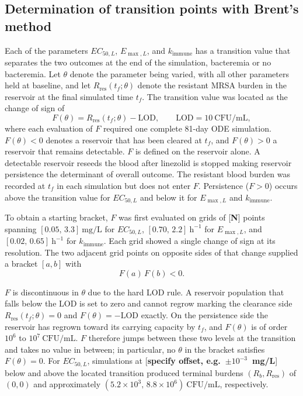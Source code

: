 \documentclass[utf8]{FrontiersinHarvard} %
\begin{document}
\subsection{Determination of transition points with Brent's method}
\label{sec:transition}

Each of the parameters $EC_{50,L}$, $E_{\max,L}$, and $k_{\mathrm{immune}}$ has
a transition value that separates the two outcomes at the end of the
simulation, bacteremia or no bacteremia. Let $\theta$ denote
the parameter being varied, with all other parameters held at baseline, and let
$R_{\mathrm{res}}(t_f;\theta)$ denote the resistant MRSA burden in the
reservoir at the final simulated time $t_f$. The transition value was located
as the change of sign of
\begin{equation}
    F(\theta) = R_{\mathrm{res}}(t_f;\theta) - \mathrm{LOD},
    \qquad \mathrm{LOD} = 10~\mathrm{CFU/mL},
    \label{eq:brent-objective}
\end{equation}
where each evaluation of $F$ required one complete 81-day ODE simulation.
$F(\theta) < 0$ denotes a reservoir that has been cleared at $t_f$, and
$F(\theta) > 0$ a reservoir that remains detectable. $F$ is defined on the
reservoir alone.  A detectable reservoir reseeds the blood after
linezolid is stopped making reservoir persistence the determinant of overall outcome.
The resistant blood burden was recorded at $t_f$ in each simulation but does
not enter $F$. Persistence ($F > 0$) occurs above the transition value for
$EC_{50,L}$ and below it for $E_{\max,L}$ and $k_{\mathrm{immune}}$.

To obtain a starting bracket, $F$ was first evaluated on grids of
[\textbf{N}] points spanning $[0.05,\, 3.3]~\mathrm{mg/L}$ for $EC_{50,L}$,
$[0.70,\, 2.2]~\mathrm{h}^{-1}$ for $E_{\max,L}$, and
$[0.02,\, 0.65]~\mathrm{h}^{-1}$ for $k_{\mathrm{immune}}$. Each grid showed a
single change of sign at its resolution. The two adjacent grid points on
opposite sides of that change supplied a bracket $[a,b]$ with
\begin{equation}
    F(a)\,F(b) < 0.
    \label{eq:brent-bracket}
\end{equation}

$F$ is discontinuous in $\theta$ due to the hard LOD rule. A reservoir
population that falls below the LOD is set to zero and cannot regrow marking
the clearance side $R_{\mathrm{res}}(t_f;\theta) = 0$ and
$F(\theta) = -\mathrm{LOD}$ exactly. On the persistence side the reservoir has
regrown toward its carrying capacity by $t_f$, and $F(\theta)$ is of order
$10^{6}$ to $10^{7}~\mathrm{CFU/mL}$. $F$ therefore jumps between these two
levels at the transition and takes no value in between; in particular, no
$\theta$ in the bracket satisfies $F(\theta) = 0$. For $EC_{50,L}$, simulations
at [\textbf{specify offset, e.g.\ $\pm 10^{-3}$~mg/L}] below and above the
located transition produced terminal burdens $(R_b, R_{\mathrm{res}})$ of
$(0,0)$ and approximately $(5.2 \times 10^{3},\, 8.8 \times 10^{6})~\mathrm{CFU/mL}$,
respectively.
\end{document}
